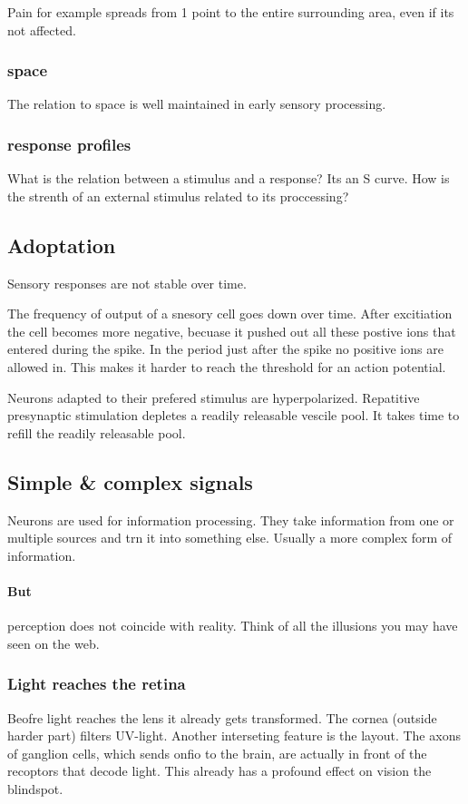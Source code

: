 \documentclass{article}
\begin{document}
Pain for example spreads from 1 point to the entire surrounding area, even
if its not affected.

\subsubsection{space}
The relation to space is well maintained in early sensory processing.

\subsubsection{response profiles}
What is the relation between a stimulus and a response?  Its an S curve.
How is the strenth of an external stimulus related to its proccessing?

\subsection{Adoptation}
Sensory responses are not stable over time.

The frequency of output of a snesory cell goes down over time. After
excitiation
the cell becomes more negative, becuase it pushed out all these postive ions
that entered during the spike. In the period just after the spike no positive
ions are allowed in. This makes it harder to reach the threshold for an
action potential.

Neurons adapted to their prefered stimulus are hyperpolarized. Repatitive
presynaptic stimulation depletes a readily releasable vescile pool.
It takes time to refill the readily releasable pool.

\subsection{Simple \& complex signals}
Neurons are used for information processing. They take information from
one or multiple sources and trn it into something else. Usually a more
complex form of information.

\paragraph{But} perception does not coincide with reality. Think of all the
illusions you may have seen on the web.

\subsubsection{Light reaches the retina}
Beofre light reaches the lens it already gets transformed. The cornea
(outside harder part) filters UV-light. Another interseting feature is the
layout. The axons of ganglion cells, which sends onfio to the brain,
are actually in front of the recoptors that decode light.
This already has a profound effect on vision the blindspot.
\end{document}

